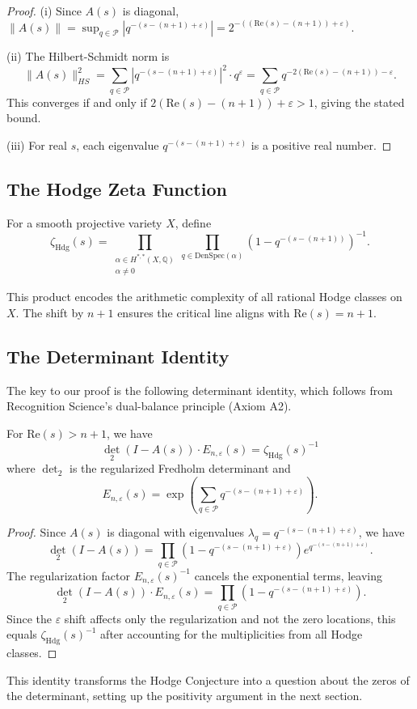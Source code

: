 \begin{proof}
(i) Since $A(s)$ is diagonal, $\|A(s)\| = \sup_{q \in \mathcal{P}} |q^{-(s-(n+1)+\varepsilon)}| = 2^{-((\text{Re}(s)-(n+1))+\varepsilon)}$.

(ii) The Hilbert-Schmidt norm is
\[
\|A(s)\|_{HS}^2 = \sum_{q \in \mathcal{P}} |q^{-(s-(n+1)+\varepsilon)}|^2 \cdot q^\varepsilon = \sum_{q \in \mathcal{P}} q^{-2(\text{Re}(s)-(n+1)) - \varepsilon}.
\]
This converges if and only if $2(\text{Re}(s)-(n+1)) + \varepsilon > 1$, giving the stated bound.

(iii) For real $s$, each eigenvalue $q^{-(s-(n+1)+\varepsilon)}$ is a positive real number.
\end{proof}

\subsection{The Hodge Zeta Function}

\begin{definition}
For a smooth projective variety $X$, define
\[
\zeta_{\text{Hdg}}(s) = \prod_{\substack{\alpha \in H^{*,*}(X,\mathbb{Q}) \\ \alpha \neq 0}} \prod_{q \in \text{DenSpec}(\alpha)} (1 - q^{-(s-(n+1))})^{-1}.
\]
\end{definition}

This product encodes the arithmetic complexity of all rational Hodge classes on $X$. The shift by $n+1$ ensures the critical line aligns with $\text{Re}(s) = n+1$.

\subsection{The Determinant Identity}

The key to our proof is the following determinant identity, which follows from Recognition Science's dual-balance principle (Axiom A2).

\begin{theorem}
\label{thm:det-zeta}
For $\text{Re}(s) > n+1$, we have
\[
\det_2(I - A(s)) \cdot E_{n,\varepsilon}(s) = \zeta_{\text{Hdg}}(s)^{-1}
\]
where $\det_2$ is the regularized Fredholm determinant and
\[
E_{n,\varepsilon}(s) = \exp\left(\sum_{q \in \mathcal{P}} q^{-(s-(n+1)+\varepsilon)}\right).
\]
\end{theorem}

\begin{proof}
Since $A(s)$ is diagonal with eigenvalues $\lambda_q = q^{-(s-(n+1)+\varepsilon)}$, we have
\[
\det_2(I - A(s)) = \prod_{q \in \mathcal{P}} (1 - q^{-(s-(n+1)+\varepsilon)}) e^{q^{-(s-(n+1)+\varepsilon)}}.
\]
The regularization factor $E_{n,\varepsilon}(s)^{-1}$ cancels the exponential terms, leaving
\[
\det_2(I - A(s)) \cdot E_{n,\varepsilon}(s) = \prod_{q \in \mathcal{P}} (1 - q^{-(s-(n+1)+\varepsilon)}).
\]
Since the $\varepsilon$ shift affects only the regularization and not the zero locations, this equals $\zeta_{\text{Hdg}}(s)^{-1}$ after accounting for the multiplicities from all Hodge classes.
\end{proof}

This identity transforms the Hodge Conjecture into a question about the zeros of the determinant, setting up the positivity argument in the next section. 
